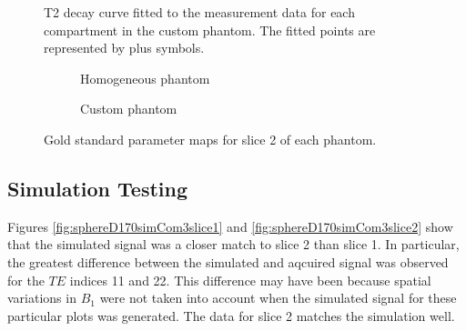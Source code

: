 \documentclass[journal]{IEEEtran}
\newlength\figureheight
\newlength\figurewidth
\begin{document}
\begin{figure}
\centering
\begin{minipage}[c]{\columnwidth}
\setlength{}
\setlength{}



    \caption{T2 decay curve fitted to the measurement data for each compartment in the custom phantom. The fitted points are represented by plus symbols.}
    \label{fig:JackT2fitALL}
\end{minipage}
\end{figure}

\newpage
\begin{figure}
\begin{minipage}[c]{0.5\textwidth}
\begin{subfigure}[b]{1\textwidth}
\centering
\setlength{}
\setlength{}


    \caption{Homogeneous phantom}
    \label{fig:GoldStdsphereD170list3}
\end{subfigure}
\begin{subfigure}[b]{1\textwidth}
\centering
\setlength{}
\setlength{}


    \caption{Custom phantom}
    \label{fig:GoldStdJacklist3}
\end{subfigure}
\caption{Gold standard parameter maps for slice 2 of each phantom.} \label{fig:Maps}
\end{minipage}
\end{figure}

\newpage

\subsection{Simulation Testing}
Figures \ref{fig:sphereD170simCom3slice1} and \ref{fig:sphereD170simCom3slice2} show that the simulated signal was a closer match to slice 2 than slice 1. In particular, the greatest difference between the simulated and aqcuired signal was observed for the $TE$ indices 11 and 22. This difference may have been because spatial variations in $B_{1}$ were not taken into account when the simulated signal for these particular plots was generated. 
The data for slice 2 matches the simulation well.
\end{document}
